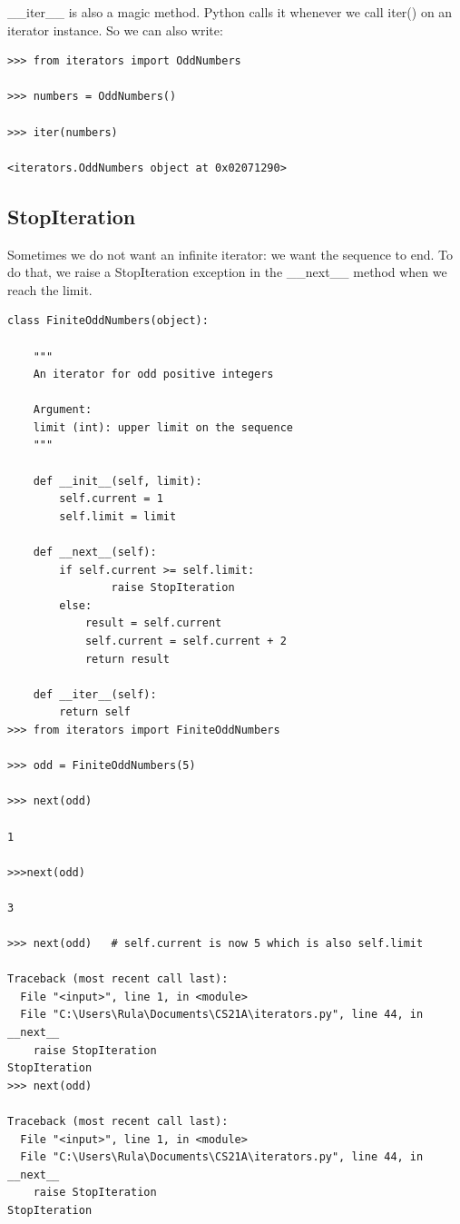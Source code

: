 \documentclass{article}
\begin{document}
{\_}{\_}iter{\_}{\_} is also a magic method.  Python calls it whenever we call iter() on an iterator instance.  So we can also write:

\begin{lstlisting}
>>> from iterators import OddNumbers

>>> numbers = OddNumbers()

>>> iter(numbers)

<iterators.OddNumbers object at 0x02071290>
\end{lstlisting}

\subsection{StopIteration}
Sometimes we do not want an infinite iterator:  we want the sequence to end. To do that, we raise a StopIteration exception in the  {\_}{\_}next{\_}{\_}  method when we reach the limit.
\begin{lstlisting}
class FiniteOddNumbers(object):
 
    """
    An iterator for odd positive integers
 
    Argument:
    limit (int): upper limit on the sequence
    """
 
    def __init__(self, limit):
        self.current = 1
        self.limit = limit
 
    def __next__(self):
        if self.current >= self.limit:
                raise StopIteration
        else:
            result = self.current
            self.current = self.current + 2
            return result
 
    def __iter__(self):
        return self
>>> from iterators import FiniteOddNumbers

>>> odd = FiniteOddNumbers(5)

>>> next(odd) 

1

>>>next(odd)

3

>>> next(odd)   # self.current is now 5 which is also self.limit

Traceback (most recent call last):
  File "<input>", line 1, in <module>
  File "C:\Users\Rula\Documents\CS21A\iterators.py", line 44, in __next__
    raise StopIteration
StopIteration
>>> next(odd)

Traceback (most recent call last):
  File "<input>", line 1, in <module>
  File "C:\Users\Rula\Documents\CS21A\iterators.py", line 44, in __next__
    raise StopIteration
StopIteration
\end{lstlisting}
\end{document}
